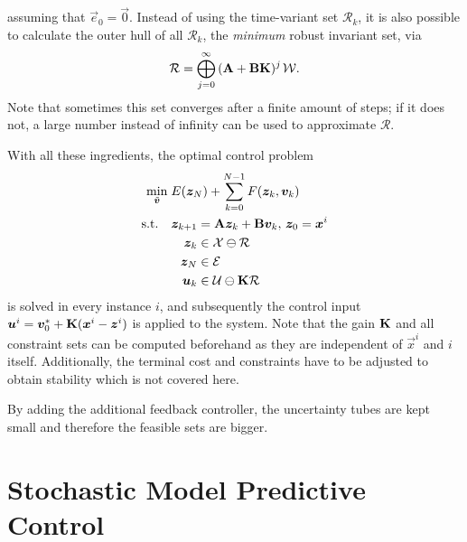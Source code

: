 		assuming that \( \vec{e}_0 = \vec{0} \). Instead of using the time-variant set \(\mathcal{R}_k\), it is also possible to calculate the outer hull of all \(\mathcal{R}_k\), the \emph{minimum} robust invariant set, via
		\begin{equation}
			\mathcal{R} = \bigoplus_{j = 0}^{\infty}\, (\bm{\mathrm{A}} + \bm{\mathrm{B}} \bm{\mathrm{K}})^{j\,} \mathcal{W}.
		\end{equation}
		Note that sometimes this set converges after a finite amount of steps; if it does not, a large number instead of infinity can be used to approximate \(\mathcal{R}\).

		With all these ingredients, the optimal control problem
		\begin{equation}
			\begin{aligned}
				\min_{\tilde{\bm{v}}}\; & E(\bm{z}_N) + \sum_{k = 0}^{N - 1} F(\bm{z}_k, \bm{v}_k) \\
				\text{s.t.}\quad         &
				\begin{aligned}[t]
					\bm{z}_{k + 1} & = \bm{\mathrm{A}} \bm{z}_k + \bm{\mathrm{B}} \bm{v}_k,\, \bm{z}_0 = \bm{x}^i \\
					\bm{z}_k       & \in \mathcal{X} \ominus \mathcal{R}                              \\
					\bm{z}_N       & \in \mathcal{E}                                                  \\
					\bm{u}_k       & \in \mathcal{U} \ominus \bm{\mathrm{K}} \mathcal{R}
				\end{aligned}
			\end{aligned}
		\end{equation}
		is solved in every instance \(i\), and subsequently the control input \( \bm{u}^i = \bm{v}_0^\ast + \bm{\mathrm{K}} (\bm{x}^i - \bm{z}^i) \) is applied to the system. Note that the gain \(\bm{\mathrm{K}}\) and all constraint sets can be computed beforehand as they are independent of \(\vec{x}^i\) and \(i\) itself. Additionally, the terminal cost and constraints have to be adjusted to obtain stability which is not covered here.

		By adding the additional feedback controller, the uncertainty tubes are kept small and therefore the feasible sets are bigger.

\chapter{Stochastic Model Predictive Control}
	\label{c:mpcStochastic}

